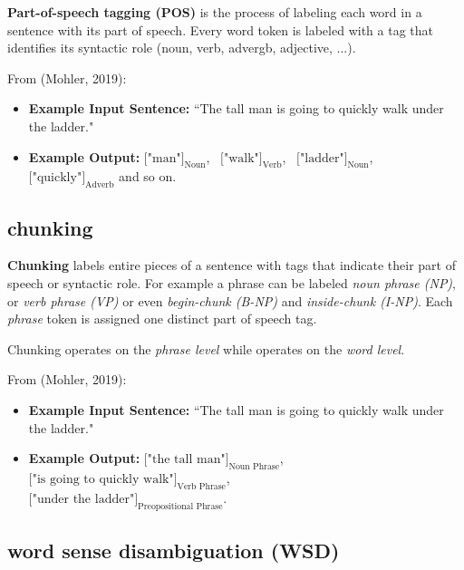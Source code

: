 \textbf{Part-of-speech tagging (POS)} is the process of labeling each word in a sentence with its part of speech. Every word token is labeled with a tag that identifies its syntactic role (noun, verb, advergb, adjective, ...).  

From (Mohler, 2019): 

\begin{itemize}
    \item \textbf{Example Input Sentence: } ``The tall man is going to quickly walk under the ladder."
    
    \item \textbf{Example Output: } $\Big[ \text{"man"}\Big]_\text{Noun}$, \ $\Big[ \text{"walk"}\Big]_\text{Verb}$, \ $\Big[ \text{"ladder"}\Big]_\text{Noun}$, \ $\Big[ \text{"quickly"}\Big]_\text{Adverb}$ and so on. 
\end{itemize}




\subsection{chunking} \label{nlptask:chunking}

\textbf{Chunking} labels entire pieces of a sentence with tags that indicate their part of speech or syntactic role. For example a phrase can be labeled \emph{noun phrase (NP)}, or \emph{verb phrase (VP)} or even \emph{begin-chunk (B-NP)} and \emph{inside-chunk (I-NP)}. Each \emph{phrase} token is assigned one distinct part of speech tag. 

Chunking operates on the \emph{phrase level} while  operates on the \emph{word level}. 

From (Mohler, 2019): 
\begin{itemize}
    \item \textbf{Example Input Sentence: } ``The tall man is going to quickly walk under the ladder."
    
    \item \textbf{Example Output: } $\Big[ \text{"the tall man"}\Big]_\text{Noun Phrase}$, \ $\Big[ \text{"is going to quickly walk"}\Big]_\text{Verb Phrase}$, \\ $\Big[ \text{"under the ladder"}\Big]_\text{Preopositional Phrase}$.
\end{itemize}




\subsection{word sense disambiguation (WSD)} \label{nlptask:wordsensedisambiguatioNWSD}


